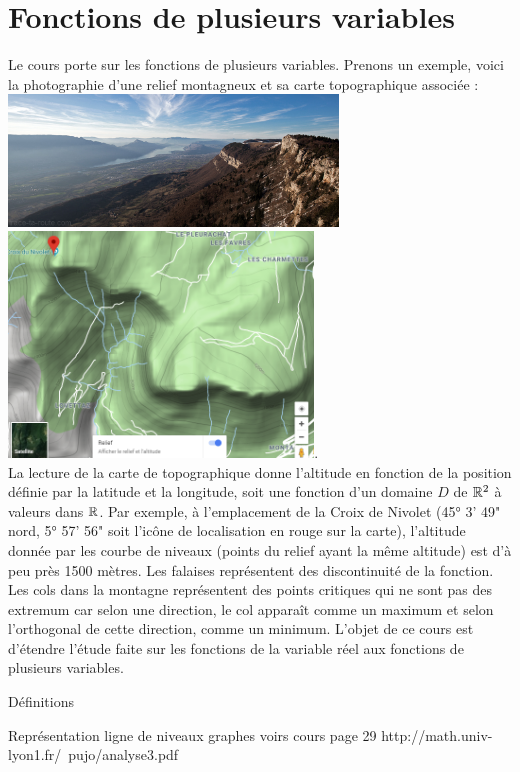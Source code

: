 \documentclass{book}
\begin{document}
\chapter*{Fonctions de plusieurs variables}
Le cours porte sur les fonctions de plusieurs variables. Prenons un exemple, voici la photographie d'une relief montagneux et sa carte topographique associée :\\
\includegraphics[height=3.5cm]{topography.png}
\includegraphics[height=6cm]{topography2.png}.\\
La lecture de la carte de topographique donne l'altitude en fonction de la position définie par la latitude et la longitude, soit une fonction d'un domaine $D$ de $\mathbb{R}^2$ à valeurs dans $\mathbb{R}$.  Par exemple, à l'emplacement de la  Croix de Nivolet (45° 3' 49" nord, 5° 57' 56" soit l'icône de localisation en rouge sur la carte), l'altitude donnée par les courbe de niveaux (points du relief ayant la même altitude) est d'à peu près 1500 mètres. Les falaises représentent des discontinuité de la fonction. Les cols dans la montagne représentent des points critiques qui ne sont pas des extremum car selon une direction, le col apparaît comme un maximum et selon l'orthogonal de cette direction, comme un minimum.     
L'objet de ce cours est d'étendre l'étude faite sur les fonctions de la variable réel aux fonctions de plusieurs variables.

     
Définitions

Représentation ligne de niveaux graphes voirs cours page 29 http://math.univ-lyon1.fr/~pujo/analyse3.pdf     
     
\end{document}
